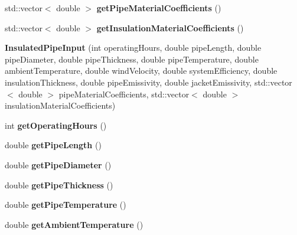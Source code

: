 \begin{DoxyCompactItemize}
std\+::vector$<$ double $>$ {\bfseries get\+Pipe\+Material\+Coefficients} ()
\item 
\mbox{\label{class_insulated_pipe_input_ad6dd2c9df8b6c3487d14808cba72a91d}} 
std\+::vector$<$ double $>$ {\bfseries get\+Insulation\+Material\+Coefficients} ()
\item 
\mbox{\label{class_insulated_pipe_input_a468ececc5c5a120b4e4a008bb9491966}} 
{\bfseries Insulated\+Pipe\+Input} (int operating\+Hours, double pipe\+Length, double pipe\+Diameter, double pipe\+Thickness, double pipe\+Temperature, double ambient\+Temperature, double wind\+Velocity, double system\+Efficiency, double insulation\+Thickness, double pipe\+Emissivity, double jacket\+Emissivity, std\+::vector$<$ double $>$ pipe\+Material\+Coefficients, std\+::vector$<$ double $>$ insulation\+Material\+Coefficients)
\item 
\mbox{\label{class_insulated_pipe_input_a001e1d1dbab85f87e08e05c192bb92e6}} 
int {\bfseries get\+Operating\+Hours} ()
\item 
\mbox{\label{class_insulated_pipe_input_adb11559587bf7f74a2b46c16ab80bbf1}} 
double {\bfseries get\+Pipe\+Length} ()
\item 
\mbox{\label{class_insulated_pipe_input_af8f76905b5a0f9dcd65c098f7fd1fa8f}} 
double {\bfseries get\+Pipe\+Diameter} ()
\item 
\mbox{\label{class_insulated_pipe_input_a4bf5fd5828533ae03eb3f2b1697c84f9}} 
double {\bfseries get\+Pipe\+Thickness} ()
\item 
\mbox{\label{class_insulated_pipe_input_a3ea79c3e73cddca6361893f98f3c5b91}} 
double {\bfseries get\+Pipe\+Temperature} ()
\item 
\mbox{\label{class_insulated_pipe_input_a2a1618b06bdbfe6bf3b3f5ae57e074dd}} 
double {\bfseries get\+Ambient\+Temperature} ()
\item 
\mbox{\label{class_insulated_pipe_input_acf316b239d1bdd7746f89fb3f52a5487}} 

\end{DoxyCompactItemize}
